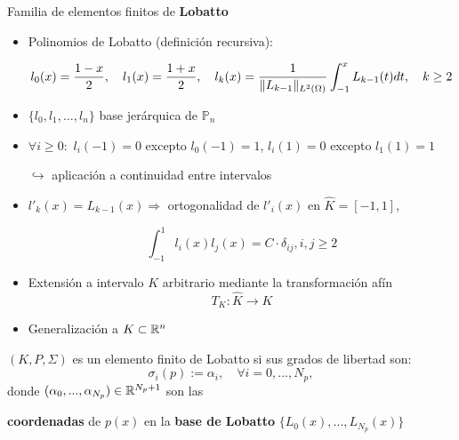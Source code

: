 \documentclass[10pt,leqno]{beamer}
\newcommand{\Np}{{N_p}}
\newcommand{\refelem}{\widehat}
\begin{document}
\begin{frame}{Familia de elementos finitos de \textbf{Lobatto}}
  \small
  \begin{itemize}
  \item Polinomios de Lobatto (definición recursiva):
    \begin{footnotesize}
      \begin{align*}
        l_0(x)=\frac{1-x}2, \quad l_1(x)=\frac{1+x}2,
        \quad l_{k}(x) = \frac 1{\norm[L^2(\Omega)]{L_{k-1}}} \int_{-1}^x L_{k-1}(t) dt, \quad k\ge 2
      \end{align*}
    \end{footnotesize}
  \item $\{l_0,l_1,\dots,l_n\}$ base jerárquica de $\mathbb{P}_n$
  \item $\forall i\ge 0:$ \quad $l_i(-1)=0$ excepto \alert{$l_0(-1)=1$},
    \quad $l_i(1)=0$ excepto \alert{$l_1(1)=1$}
    \begin{flushright}
      \scriptsize
      $\hookrightarrow$ aplicación a \alert{continuidad} entre intervalos
    \end{flushright}
  \item $l'_k(x)=L_{k-1}(x) \Rightarrow$ \alert{ortogonalidad de $l'_i(x)$} en
    $\refelem K=[-1,1]$,
    \begin{footnotesize}
      $$\int_{-1}^1 l_i(x) l_j(x) = C\cdot \delta_{ij}, i,j\ge 2$$
    \end{footnotesize}

  \item \footnotesize Extensión a intervalo $K$ arbitrario mediante la transformación afín
    $$T_K : \refelem K \to K$$
  \item \footnotesize Generalización a $K\subset\Rset^n$~\cite{solin_higher-order_2004}
  \end{itemize}
  \vspace{-0.3em}
  \normalsize
  \begin{definition} $(K,P,\Sigma)$ es un \alert{elemento finito de
      Lobatto} si sus grados de libertad son:
    \vspace{-0.2em}
    $$
    \sigma_i(p) := \alpha_i, \quad \forall i=0,...,\Np,
    $$
    \vspace{-0.2em}
    donde $(\alpha_0,...,\alpha_\Np) \in\Rset^{\Np+1}$ son las
    \vspace{-0.2em}
    \begin{center}
      \textbf{coordenadas} de $p(x)$ en la \textbf{base de Lobatto}
      $\{L_0(x),...,L_\Np(x)\}$
    \end{center}
  \end{definition}
\end{frame}
\end{document}
